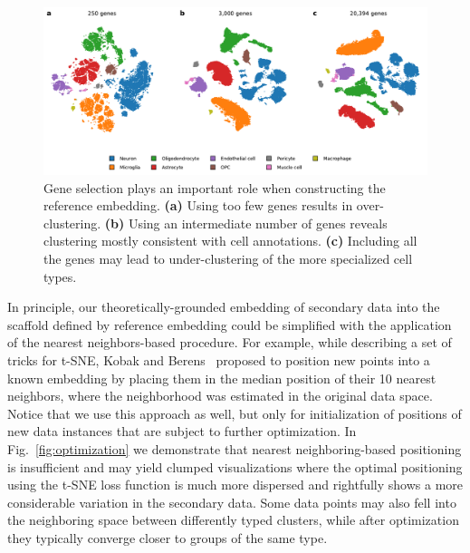 \documentclass[runningheads]{llncs}
\begin{document}
\begin{figure}[htbp]
\includegraphics[width=\textwidth]{figures/hrvatin_embedding_tsne_genes.pdf}
\caption{Gene selection plays an important role when constructing the reference
embedding. {\bf (a)} Using too few genes results in over-clustering. {\bf (b)}
Using an intermediate number of genes reveals clustering mostly consistent with
cell annotations. {\bf (c)} Including all the genes may lead to
under-clustering of the more specialized cell types.}
\label{fig:gene_selection}
\end{figure}

In principle, our theoretically-grounded embedding of secondary data into the
scaffold defined by reference embedding could be simplified with the
application of the nearest neighbors-based procedure. For example, while
describing a set of tricks for t-SNE, Kobak and Berens~\cite{art_of_using_tsne}
proposed to position new points into a known embedding by placing them in the
median position of their 10 nearest neighbors, where the neighborhood was
estimated in the original data space. Notice that we use this approach as well,
but only for initialization of positions of new data instances that are subject
to further optimization. In Fig.~\ref{fig:optimization} we demonstrate that
nearest neighboring-based positioning is insufficient and may yield clumped
visualizations where the optimal positioning using the t-SNE loss function is
much more dispersed and rightfully shows a more considerable variation in the
secondary data. Some data points may also fell into the neighboring space
between differently typed clusters, while after optimization they typically
converge closer to groups of the same type.
\end{document}
